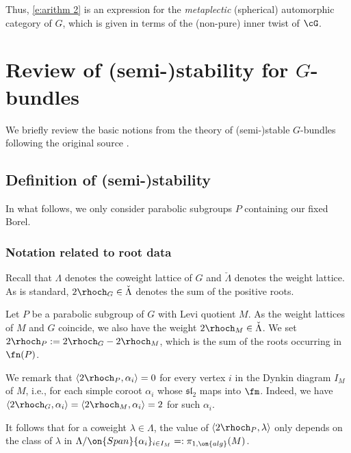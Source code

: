 \documentclass[9pt]{amsart}
\theoremstyle{remark}
\theoremstyle{definition}
\theoremstyle{remark}
\numberwithin{equation}{section}
\begin{document}
Thus, \eqref{e:arithm 2} is an expression for the \emph{metaplectic} (spherical) automorphic category 
of $G$, which is given in terms of the (non-pure) inner twist of $\cG$. 

\appendix

\section{Review of (semi-)stability for \texorpdfstring{$G$}{stb}-bundles}\label{s:stable}

We briefly review the
basic notions from the theory of (semi-)stable $G$-bundles
following the original source \cite{Ra}.

\subsection{Definition of (semi-)stability}

In what follows, we only consider parabolic subgroups $P$ 
containing our fixed Borel. 

\subsubsection{Notation related to root data}

Recall that $\Lambda$ denotes the coweight lattice of $G$ and 
$\check{\Lambda}$ denotes the weight lattice. 
As is standard, $2\rhoch_G \in \check{\Lambda}$ denotes the sum of the positive
roots. 

\medskip 

Let $P$ be a parabolic subgroup of $G$ with Levi quotient $M$.
As the weight lattices of $M$ and $G$ coincide, 
we also have the weight $2\rhoch_M \in \check{\Lambda}$.
We set $2\rhoch_P := 2\rhoch_G -2\rhoch_M$, which is the sum of the roots
occurring in $\fn(P)$. 

\medskip 

We remark that $\langle 2\rhoch_P,\alpha_i\rangle = 0$ for 
every vertex $i$ in the Dynkin diagram $I_M$ of $M$, i.e., for each
simple coroot $\alpha_i$ whose $\mathfrak{sl}_2$ maps into $\fm$. Indeed,
we have $\langle 2\rhoch_G,\alpha_i\rangle = 
\langle 2\rhoch_M,\alpha_i\rangle = 2$ for such $\alpha_i$.

\medskip 

It follows that for a coweight $\lambda \in \Lambda$, the value of 
$\langle 2\rhoch_P,\lambda\rangle$ only depends on the class of 
$\lambda$ in $\Lambda/\on{Span}\{\alpha_i\}_{i \in I_M} =: 
\pi_{1,\on{alg}}(M)$.
\end{document}
